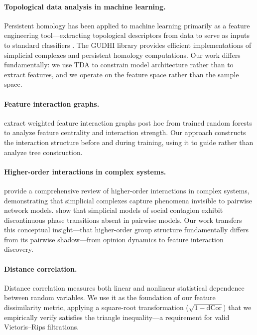 \documentclass[11pt,letterpaper]{article}
\begin{document}
\paragraph{Topological data analysis in machine learning.}
Persistent homology \citep{Zomorodian2005} has been applied to machine learning primarily as a feature engineering tool---extracting topological descriptors from data to serve as inputs to standard classifiers \citep{Pun2022}. The GUDHI library \citep{Maria2014} provides efficient implementations of simplicial complexes and persistent homology computations. Our work differs fundamentally: we use TDA to constrain model architecture rather than to extract features, and we operate on the feature space rather than the sample space.

\paragraph{Feature interaction graphs.}
\citet{Sirocchi2025} extract weighted feature interaction graphs post hoc from trained random forests to analyze feature centrality and interaction strength. Our approach constructs the interaction structure before and during training, using it to guide rather than analyze tree construction.

\paragraph{Higher-order interactions in complex systems.}
\citet{Battiston2021} provide a comprehensive review of higher-order interactions in complex systems, demonstrating that simplicial complexes capture phenomena invisible to pairwise network models. \citet{Iacopini2019} show that simplicial models of social contagion exhibit discontinuous phase transitions absent in pairwise models. Our work transfers this conceptual insight---that higher-order group structure fundamentally differs from its pairwise shadow---from opinion dynamics to feature interaction discovery.

\paragraph{Distance correlation.}
Distance correlation \citep{Szekely2007} measures both linear and nonlinear statistical dependence between random variables. We use it as the foundation of our feature dissimilarity metric, applying a square-root transformation ($\sqrt{1 - \text{dCor}}$) that we empirically verify satisfies the triangle inequality---a requirement for valid Vietoris--Rips filtrations.
\end{document}
